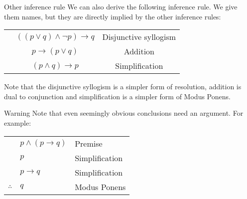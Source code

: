 \documentclass{article}
\begin{document}
\begin{parag}{Other inference rule}
    We can also derive the following inference rule. We give them names, but they are directly implied by the other inference rules:
    \begin{center}
        \begin{tabularx}{\linewidth}{|>{\hsize}C|>{\hsize}C|>{\hsize}C|}
        \hline
         &  &  \\
        \hline
         & $\left(\left(p \lor q\right) \land\lnot p\right) \to q$ & Disjunctive syllogism\\
        \hline
         & $p \to \left(p \lor q\right)$ & Addition \\
        \hline
         & $\left(p \land q\right) \to p$ & Simplification \\
        \hline
    \end{tabularx}
    \end{center}

    Note that the disjunctive syllogism is a simpler form of resolution, addition is dual to conjunction and simplification is a simpler form of Modus Ponens.
\end{parag}

\begin{parag}{Warning}
    Note that even seemingly obvious conclusions need an argument. For example:
    \begin{center}
    \begin{tabular}{rll}
        & $p \land \left(p \to q\right)$ & Premise \\
        & $p$ & Simplification \\
        & $p \to q$ & Simplification \\
        \hline
        $\therefore$ & $q$ & Modus Ponens
    \end{tabular}
    \end{center}
\end{parag}
\end{document}
